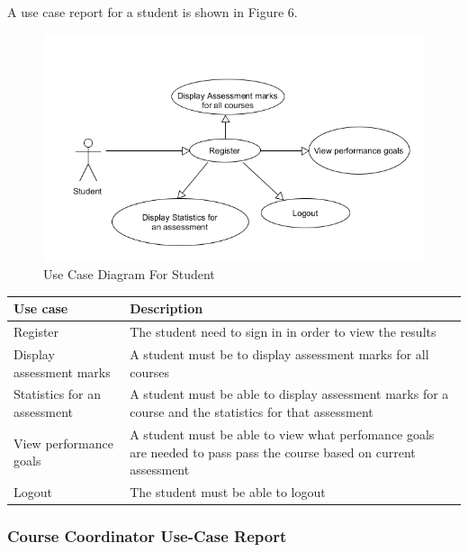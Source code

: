 	A use case report for a student is shown in Figure 6.
	\begin{center}
		\begin{figure}[h]
			\centering
			\includegraphics[trim={0cm 0cm 0cm 0cm },clip,scale = 1.1]{StudentUsecase}
			\caption{Use Case Diagram For Student}
		\end{figure}
	\end{center}
	
	
	
	\begin{center}
		\begin{tabular}{ | p{3cm} | p{10cm}| }
			\hline
			\textbf{Use case}& \textbf{Description} \\ \hline
			Register & The student need to sign in in order to view the results \\ \hline
			Display assessment marks & A student must be to display assessment marks for all courses  \\ \hline
			Statistics for an assessment & A student must be able to display assessment marks for a course and the statistics for that assessment \\ \hline
			View performance goals & A student must be able to view what perfomance goals are needed to pass pass the course based on current assessment \\ \hline
			Logout          & The student must be able to logout  \\ \hline
			
		\end{tabular}
	\end{center}
	\clearpage
	\subsubsection{Course Coordinator Use-Case Report}$\;\;\;\;\;\;\;\;\;\;\;\;\;\;\;\;\;\;\;\;\;\;\;$
	
